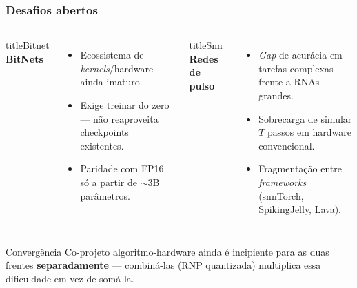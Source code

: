 \begin{frame}
	\frametitle{Desafios abertos}
	\small
	\begin{columns}
		\begin{beamercolorbox}[sep=5pt,rounded=true,shadow=true]{titleBitnet}
			\textbf{BitNets}
		\end{beamercolorbox}
		\begin{itemize}
			\setlength{\itemsep}{0pt}
			\item Ecossistema de \textit{kernels}/hardware ainda imaturo.
			\item Exige treinar do zero --- não reaproveita checkpoints existentes.
			\item Paridade com FP16 só a partir de $\sim$3B parâmetros.
		\end{itemize}
		\begin{beamercolorbox}[sep=5pt,rounded=true,shadow=true]{titleSnn}
			\textbf{Redes de pulso}
		\end{beamercolorbox}
		\begin{itemize}
			\setlength{\itemsep}{0pt}
			\item \textit{Gap} de acurácia em tarefas complexas frente a RNAs grandes.
			\item Sobrecarga de simular $T$ passos em hardware convencional.
			\item Fragmentação entre \textit{frameworks} (snnTorch, SpikingJelly, Lava).
		\end{itemize}
	\end{columns}

	\begin{alertblock}{Convergência}
		Co-projeto algoritmo-hardware ainda é incipiente para as duas frentes \textbf{separadamente} --- combiná-las (RNP quantizada) multiplica essa dificuldade em vez de somá-la.
	\end{alertblock}
\end{frame}

